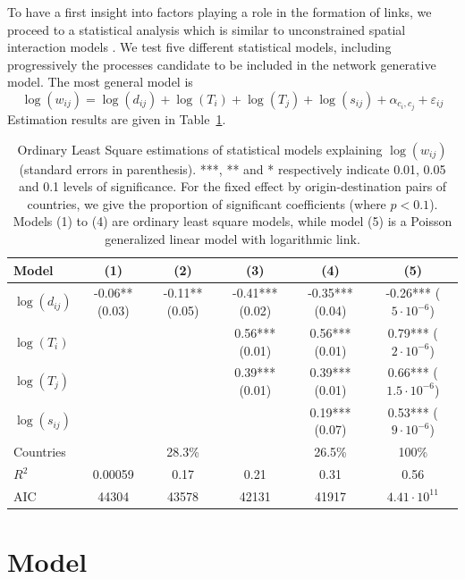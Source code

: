 \documentclass[11pt]{article}
\begin{document}
To have a first insight into factors playing a role in the formation of links, we proceed to a statistical analysis which is similar to unconstrained spatial interaction models \cite{wilson1975some}. We test five different statistical models, including progressively the processes candidate to be included in the network generative model. The most general model is
\[
\log(w_{ij}) = \log(d_{ij}) + \log(T_i) + \log(T_j) + \log(s_{ij}) + \alpha_{c_i,c_j} + \varepsilon_{ij}
\]
Estimation results are given in Table~\ref{tab:reg}.


\begin{table}[h]
\caption{Ordinary Least Square estimations of statistical models explaining $\log(w_{ij})$ (standard errors in parenthesis). ***, ** and * respectively indicate 0.01, 0.05 and 0.1 levels of significance. For the fixed effect by origin-destination pairs of countries, we give the proportion of significant coefficients (where $p<0.1$). Models (1) to (4) are ordinary least square models, while model (5) is a Poisson generalized linear model with logarithmic link.\label{tab:reg}}
\medskip
\begin{tabular}{|l|c|c|c|c|c|}
\hline
Model  & (1) & (2) & (3) & (4) & (5) \\ 
\hline
$\log(d_{ij})$ &      -0.06** (0.03) &   -0.11** (0.05)  & -0.41*** (0.02)  & -0.35*** (0.04)  &  -0.26*** ($5\cdot 10^{-6}$) \\
$\log(T_i)$ &   &   & 0.56*** (0.01) &  0.56*** (0.01) & 0.79*** ($2\cdot 10^{-6}$) \\
$\log(T_j)$ &     &   & 0.39*** (0.01) &  0.39*** (0.01) & 0.66***  ($1.5\cdot 10^{-6}$) \\
$\log(s_{ij})$ &     &   &  &  0.19*** (0.07) & 0.53*** ($9\cdot 10^{-6}$)  \\
Countries &    &  28.3\% &   &  26.5\% & 100\% \\
\hline
$R^2$ &       0.00059   &  0.17 & 0.21 &  0.31  &  0.56 \\
AIC &        44304   &  43578  &  42131  & 41917 &  $4.41\cdot 10^{11}$ \\
\hline
\end{tabular}
\end{table}



\section{Model}
\end{document}
